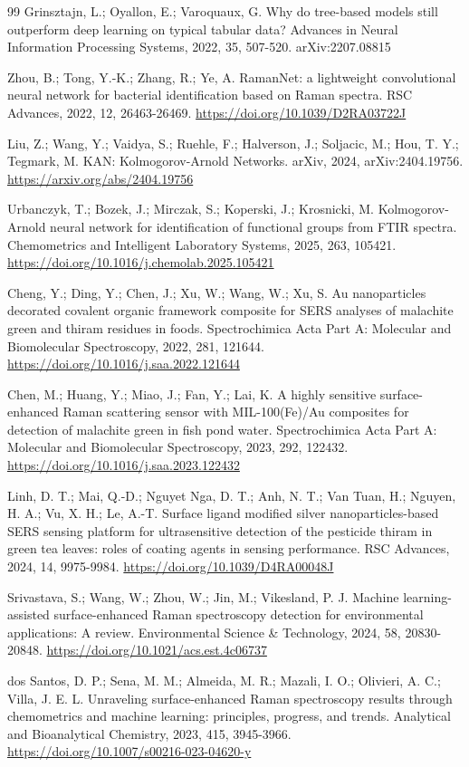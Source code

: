 \documentclass[preprint,12pt]{elsarticle}
\begin{document}
\begin{thebibliography}{99}
 Grinsztajn, L.; Oyallon, E.; Varoquaux, G. Why do tree-based models still outperform deep learning on typical tabular data? Advances in Neural Information Processing Systems, 2022, 35, 507-520. arXiv:2207.08815

 Zhou, B.; Tong, Y.-K.; Zhang, R.; Ye, A. RamanNet: a lightweight convolutional neural network for bacterial identification based on Raman spectra. RSC Advances, 2022, 12, 26463-26469. \url{https://doi.org/10.1039/D2RA03722J}

 Liu, Z.; Wang, Y.; Vaidya, S.; Ruehle, F.; Halverson, J.; Soljacic, M.; Hou, T. Y.; Tegmark, M. KAN: Kolmogorov-Arnold Networks. arXiv, 2024, arXiv:2404.19756. \url{https://arxiv.org/abs/2404.19756}

 Urbanczyk, T.; Bozek, J.; Mirczak, S.; Koperski, J.; Krosnicki, M. Kolmogorov-Arnold neural network for identification of functional groups from FTIR spectra. Chemometrics and Intelligent Laboratory Systems, 2025, 263, 105421. \url{https://doi.org/10.1016/j.chemolab.2025.105421}

 Cheng, Y.; Ding, Y.; Chen, J.; Xu, W.; Wang, W.; Xu, S. Au nanoparticles decorated covalent organic framework composite for SERS analyses of malachite green and thiram residues in foods. Spectrochimica Acta Part A: Molecular and Biomolecular Spectroscopy, 2022, 281, 121644. \url{https://doi.org/10.1016/j.saa.2022.121644}

 Chen, M.; Huang, Y.; Miao, J.; Fan, Y.; Lai, K. A highly sensitive surface-enhanced Raman scattering sensor with MIL-100(Fe)/Au composites for detection of malachite green in fish pond water. Spectrochimica Acta Part A: Molecular and Biomolecular Spectroscopy, 2023, 292, 122432. \url{https://doi.org/10.1016/j.saa.2023.122432}

 Linh, D. T.; Mai, Q.-D.; Nguyet Nga, D. T.; Anh, N. T.; Van Tuan, H.; Nguyen, H. A.; Vu, X. H.; Le, A.-T. Surface ligand modified silver nanoparticles-based SERS sensing platform for ultrasensitive detection of the pesticide thiram in green tea leaves: roles of coating agents in sensing performance. RSC Advances, 2024, 14, 9975-9984. \url{https://doi.org/10.1039/D4RA00048J}

 Srivastava, S.; Wang, W.; Zhou, W.; Jin, M.; Vikesland, P. J. Machine learning-assisted surface-enhanced Raman spectroscopy detection for environmental applications: A review. Environmental Science \& Technology, 2024, 58, 20830-20848. \url{https://doi.org/10.1021/acs.est.4c06737}

 dos Santos, D. P.; Sena, M. M.; Almeida, M. R.; Mazali, I. O.; Olivieri, A. C.; Villa, J. E. L. Unraveling surface-enhanced Raman spectroscopy results through chemometrics and machine learning: principles, progress, and trends. Analytical and Bioanalytical Chemistry, 2023, 415, 3945-3966. \url{https://doi.org/10.1007/s00216-023-04620-y}

\end{thebibliography}


\end{document}
